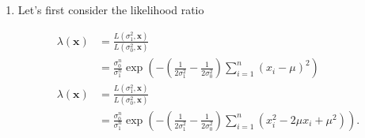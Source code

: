     \begin{solution}
    
    \phantom{}

    \begin{enumerate}[label = (\alph*)]
        \item Let's first consider the likelihood ratio
        
        \begin{align*}
            \lambda(\textbf{x}) &
            = \frac{L(\sigma_1^2, \textbf{x})}{L(\sigma_0^2, \textbf{x})} \\
            &= \frac{\sigma_0^n}{\sigma_1^n}
            \exp\left(-\left( \frac{1}{2\sigma_1^2} - \frac{1}{2\sigma_0^2}\right) \sum_{i=1}^n (x_i - \mu)^2\right) \\
            \lambda(\textbf{x}) &
      = \frac{L(\sigma_1^2, \textbf{x})}{L(\sigma_0^2, \textbf{x})} \\
      &= \frac{\sigma_0^n}{\sigma_1^n}
      \exp\left(-\left( \frac{1}{2\sigma_1^2} - \frac{1}{2\sigma_0^2}\right) 
      \sum_{i=1}^n (x_i^2 - 2\mu x_i + \mu^2)\right).
        \end{align*}
      \end{enumerate}
    
    \end{solution}
    
    